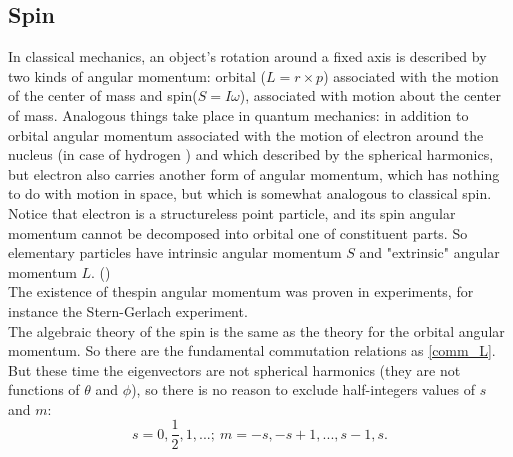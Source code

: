 \documentclass[a4paper, 12pt]{article}
\begin{document}



\subsection{Spin}
In classical mechanics, an object's rotation around a fixed axis  is described by two kinds of angular momentum: orbital ($L = r \times p$) associated with the motion of the center of mass and spin($S = I \omega$), associated with motion about the center of mass.  Analogous things take place in quantum mechanics: in addition to orbital angular momentum associated with the motion of electron around the nucleus (in case of hydrogen ) and which  described by the spherical harmonics, but electron also carries another form of angular momentum, which has nothing to do with motion in space, but which is somewhat analogous to classical spin. Notice that electron is a structureless point particle, and its spin angular momentum cannot be decomposed into orbital one of constituent parts. So elementary particles have intrinsic angular momentum $S$ and "extrinsic" angular momentum $L.$ (\cite{griffiths2016introduction})\\
The existence of thespin angular momentum was proven in experiments, for instance the Stern-Gerlach experiment.\\
The algebraic  theory of  the spin is the same as the theory for the orbital angular momentum. So there are the fundamental commutation relations as \eqref{comm_L}.
But these time the eigenvectors are not spherical harmonics (they are not functions of $\theta$ and $\phi$), so there is no reason to exclude half-integers values of $s$ and $m$:
$$s = 0, \frac{1}{2}, 1, ...;  ~ m = -s, -s+1,...,s-1, s. $$
\end{document}

